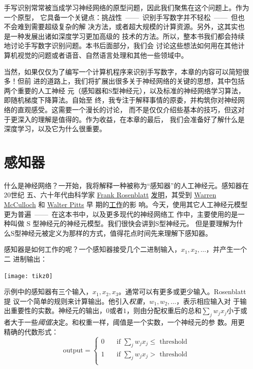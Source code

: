 手写识别常常被当成学习神经网络的原型问题，因此我们聚焦在这个问题上。作为一个原型，
它具备一个关键点：挑战性~——~识别手写数字并不轻松~——~但也不会难到需要超级复杂的解
决方法，或者超大规模的计算资源。另外，这其实也是一种发展出诸如深度学习更加高级的
技术的方法。所以，整本书我们都会持续地讨论手写数字识别问题。本书后面部分，我们会
讨论这些想法如何用在其他计算机视觉的问题或者语音、自然语言处理和其他一些领域中。

当然，如果仅仅为了编写一个计算机程序来识别手写数字，本章的内容可以简短很多！但前
进的道路上，我们将扩展出很多关于神经网络的关键的思想，其中包括两个重要的人工神经
元（感知器和S型神经元），以及标准的神经网络学习算法，即随机梯度下降算法。自始至
终，我专注于解释事情的原委，并构筑你对神经网络的直观感受。这需要一个漫长的讨论，
而不是仅仅介绍些基本的技巧，但这对于更深入的理解是值得的。作为收益，在本章的最后，
我们会准备好了解什么是深度学习，以及它为什么很重要。

\section{感知器}
\label{sec:Perceptrons}

什么是神经网络？一开始，我将解释一种被称为“感知器”的人工神经元。感知器在20世纪
五、六十年代由科学家 \href{http://en.wikipedia.org/wiki/Frank_Rosenblatt}{Frank
  Rosenblatt}
\href{http://books.google.ca/books/about/Principles_of_neurodynamics.html?id=7FhRAAAAMAAJ}{
  发明}，其受到 \href{http://en.wikipedia.org/wiki/Warren_McCulloch}{Warren
  McCulloch} 和 \href{http://en.wikipedia.org/wiki/Walter_Pitts}{Walter Pitts} 早
期的\href{http://scholar.google.ca/scholar?cluster=4035975255085082870}{工作}的影
响。今天，使用其它人工神经元模型更为普遍~——~在这本书中，以及更多现代的神经网络工
作中，主要使用的是一种叫做 S 型神经元的神经元模型。我们很快会讲到S型神经元。
但是要理解为什么S型神经元被定义为那样的方式，值得花点时间先来理解下感知器。

感知器是如何工作的呢？一个感知器接受几个二进制输入，$x_1,x_2,\ldots$，并产生一个二
进制输出：
\begin{center}
  \texttt{[image: tikz0]}
\end{center}

示例中的感知器有三个输入，$x_1,x_2,x_3$。通常可以有更多或更少输入。Rosenblatt 提
议一个简单的规则来计算输出。他引入\emph{权重}，$w_1,w_2,\ldots$，表示相应输入对
于输出重要性的实数。神经元的输出，$0$或者$1$，则由分配权重后的总和$\sum_j w_j
x_j$小于或者大于一些\emph{阈值}决定。和权重一样，阈值是一个实数，一个神经元的参
数。用更精确的代数形式：
\begin{equation}
  \text{output} = \begin{cases}
    0 & \quad \text{if } \sum_j w_j x_j \leq \text{ threshold} \\
    1 & \quad \text{if } \sum_j w_j x_j > \text{ threshold} \\
  \end{cases}
  \tag{1}
\end{equation}

